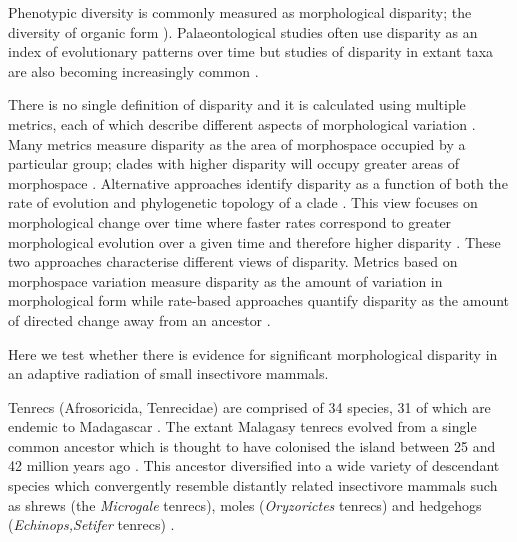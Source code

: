 \documentclass[12pt,a4paper]{article}
\begin{document}
Phenotypic diversity is commonly measured as morphological disparity; the diversity of organic form \citep{Foote1997,Erwin2007}). Palaeontological studies often use disparity as an index of evolutionary patterns over time \citep[e.g.][]{Brusatte2008, Ciampaglio2001, Wills1994} but studies of disparity in extant taxa are also becoming increasingly common \citep[e.g.][]{Harmon2003, Collar2011}. 

There is no single definition of disparity and it is calculated using multiple metrics, each of which describe different aspects of morphological variation \citep{Ciampaglio2001}. Many metrics measure disparity as the area of morphospace occupied by a particular group; clades with higher disparity will occupy greater areas of morphospace \citep[e.g.][]{Goswami2011, Brusatte2008}. Alternative approaches identify disparity as a function of both the rate of evolution and phylogenetic topology of a clade \citep{OMeara2006}. This view focuses on morphological change over time where faster rates correspond to greater morphological evolution over a given time and therefore higher disparity \citep{Price2013}. 
These two approaches characterise different views of disparity. Metrics based on morphospace variation measure disparity as the amount of variation in morphological form while rate-based approaches quantify disparity as the amount of directed change away from an ancestor \citep{Zelditch2012}.




Here we test whether there is evidence for significant morphological disparity in an adaptive radiation of small insectivore %
mammals.

Tenrecs (Afrosoricida, Tenrecidae) are comprised of 34 species, 31 of which are endemic to Madagascar \citep{Olson2013}. The extant Malagasy tenrecs evolved from a single common ancestor \citep{Asher2006} which is thought to have colonised the island between 25 and 42 million years ago \citep{Samonds2013}. This ancestor diversified into a wide variety of descendant species which convergently resemble distantly related insectivore mammals such as shrews (the \textit{Microgale} tenrecs), moles (\textit{Oryzorictes} tenrecs) and hedgehogs (\textit{Echinops,Setifer} tenrecs) \citep{Eisenberg1969}.
\end{document}
